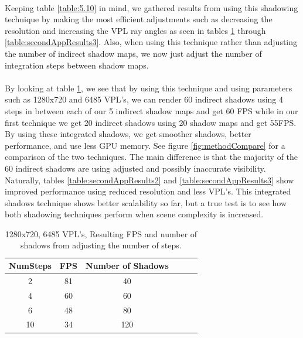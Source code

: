 \paragraph{}
Keeping table \ref{table:5.10} in mind, we gathered results from using this shadowing technique by making the most efficient adjustments such as decreasing the resolution and increasing the VPL ray angles as seen in tables \ref{table:secondAppResults1} through \ref{table:secondAppResults3}.  Also, when using this technique rather than adjusting the number of indirect shadow maps, we now just adjust the number of integration steps between shadow maps.

\paragraph{}
By looking at table \ref{table:secondAppResults1}, we see that by using this technique and using parameters such as 1280x720 and 6485 VPL's, we can render 60 indirect shadows using 4 steps in between each of our 5 indirect shadow maps and get 60 FPS while in our first technique we get 20 indirect shadows using 20 shadow maps and get 55FPS.  By using these integrated shadows, we get smoother shadows, better performance, and use less GPU memory.  See figure \ref{fig:methodCompare} for a comparison of the two techniques.  The main difference is that the majority of the 60 indirect shadows are using adjusted and possibly inaccurate visibility.  Naturally, tables \ref{table:secondAppResults2} and \ref{table:secondAppResults3} show improved performance using reduced resolution and less VPL's.  This integrated shadows technique shows better scalability so far, but a true test is to see how both shadowing techniques perform when scene complexity is increased.
\vspace{5 mm}
\begin{table}[h!]\centering
	\caption{1280x720, 6485 VPL's, Resulting FPS and number of shadows from adjusting the number of steps.}
	\begin{center}
	    \begin{tabular}{ | c | c | c | c | c | c |}
	    \hline
	    NumSteps & FPS & Number of Shadows\\ \hline
	    2 & 81 & 40\\ \hline
	    4 & 60 & 60\\ \hline
	    6 & 48 & 80\\ \hline
	    10 & 34 & 120\\ \hline
	    \end{tabular}
	\end{center}
	\label{table:secondAppResults1}
\end{table}

